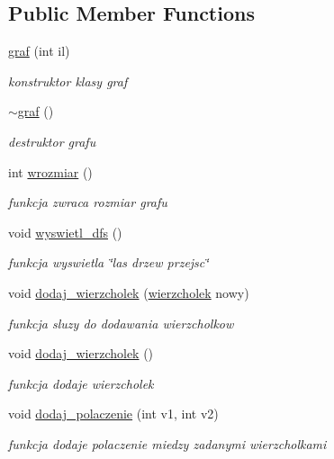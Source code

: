 \subsection*{\-Public \-Member \-Functions}
\begin{DoxyCompactItemize}
\item 
\hyperlink{classgraf_a66fe29b772c7e3085b161a31682ef093}{graf} (int il)
\begin{DoxyCompactList}\small\item\em konstruktor klasy graf \end{DoxyCompactList}\item 
\hyperlink{classgraf_a9aefd40799975c316a17bd67021e05f2}{$\sim$graf} ()
\begin{DoxyCompactList}\small\item\em destruktor grafu \end{DoxyCompactList}\item 
int \hyperlink{classgraf_aa045d28e07e38ca32adf1b353077f877}{wrozmiar} ()
\begin{DoxyCompactList}\small\item\em funkcja zwraca rozmiar grafu \end{DoxyCompactList}\item 
void \hyperlink{classgraf_a97c2722a11d3a7f90c82bc9b1cd56ef6}{wyswietl\-\_\-dfs} ()
\begin{DoxyCompactList}\small\item\em funkcja wyswietla \char`\"{}las drzew przejsc\char`\"{} \end{DoxyCompactList}\item 
void \hyperlink{classgraf_a6a50b0bfb5fc3cfc7a443014170b9565}{dodaj\-\_\-wierzcholek} (\hyperlink{classwierzcholek}{wierzcholek} nowy)
\begin{DoxyCompactList}\small\item\em funkcja sluzy do dodawania wierzcholkow \end{DoxyCompactList}\item 
void \hyperlink{classgraf_afaa55f5a9aef1f30a2b3be97b59a476b}{dodaj\-\_\-wierzcholek} ()
\begin{DoxyCompactList}\small\item\em funkcja dodaje wierzcholek \end{DoxyCompactList}\item 
void \hyperlink{classgraf_aa70de90b152f2cf47dac635793bcc5c4}{dodaj\-\_\-polaczenie} (int v1, int v2)
\begin{DoxyCompactList}\small\item\em funkcja dodaje polaczenie miedzy zadanymi wierzcholkami \end{DoxyCompactList}\item 

\end{DoxyCompactItemize}
